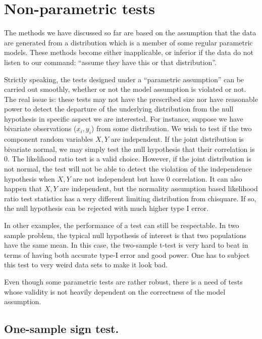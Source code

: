 \chapter{Non-parametric tests}

The methods we have discussed so
far are based on the assumption that the data are generated \iid from 
a distribution which is a member of some regular parametric models. 
These methods become either inapplicable, or inferior if the data do not listen
to our command: ``assume they have this or that distribution''.

Strictly speaking, the tests designed under a ``parametric assumption''
can be carried out smoothly, whether or not the model assumption is
violated or not.
The real issue is: these tests may not have the prescribed size
nor have reasonable power to detect the departure of the underlying
distribution from the null hypothesis in specific aspect we are interested.
For instance, suppose we have \iid bivariate observations ($x_i, y_i$) 
from some distribution.
We wish to test if the two component random variables $X, Y$ are
independent. 
If the joint distribution is bivariate normal, we may simply test the
null hypothesis that their correlation is $0$. The likelihood ratio test
is a valid choice.
However, if the joint distribution is not normal, the test will not be
able to detect the violation of the independence hypothesis when
$X, Y$ are not independent but have 0 correlation.
It can also happen that $X, Y$ are independent, but the normality
assumption based likelihood ratio test statistics has a very different
limiting distribution from chisquare. If so, the null hypothesis can be
rejected with much higher type I error.

In other examples, the performance of a test can still be respectable.
In two sample problem, the typical null hypothesis of interest is
that two populations have the same mean. In this case,
the two-sample t-test is very hard to beat in terms of 
having both accurate type-I error and good power. 
One has to subject
this test to very weird data sets to make it look bad.

Even though some parametric tests are rather robust,
there is a need of tests whose validity is not heavily dependent
on the correctness of the model assumption.



\section{One-sample sign test.}

